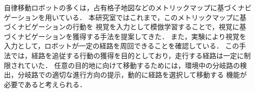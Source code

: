 %
自律移動ロボットの多くは，占有格子地図などのメトリックマップに基づくナビゲーションを用いている．
本研究室ではこれまで，このメトリックマップに基づくナビゲーションの行動を
視覚を入力として模倣学習することで，視覚に基づくナビゲーションを獲得する手法を提案してきた．
また，実験により視覚を入力として，ロボットが一定の経路を周回できることを確認している．
この手法では，経路を追従する行動の獲得を目的としており，走行する経路は一定に制限されていた．
任意の目的地に向けて移動するためには，環境中の分岐路の検出，分岐路での適切な進行方向の提示，動的に経路を選択して移動する
機能が必要であると考えられる．

